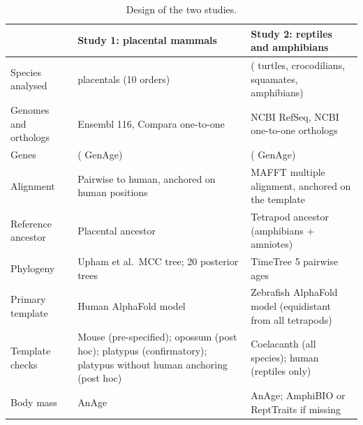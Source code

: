 \documentclass[11pt]{article}
\begin{document}
\begin{table}[tbp]
\centering
\caption{Design of the two studies.}
\label{tab:design}
\small
\begin{tabularx}{\textwidth}{p{3.3cm}YY}
\toprule
 & Study 1: placental mammals & Study 2: reptiles and amphibians \\
\midrule
Species analysed & \MNSpecies{} placentals (10 orders) & \RNSpecies{} (\RNTurtles{} turtles, \RNCrocs{} crocodilians, \RNSquamates{} squamates, \RNAmphibians{} amphibians) \\
Genomes and orthologs & Ensembl 116, Compara one-to-one & NCBI RefSeq, NCBI one-to-one orthologs \\
Genes & \MNGenes{} (\MNGenAge{} GenAge) & \RNGenes{} (\RNGenAge{} GenAge) \\
Alignment & Pairwise to human, anchored on human positions & MAFFT multiple alignment, anchored on the template \\
Reference ancestor & Placental ancestor & Tetrapod ancestor (amphibians + amniotes) \\
Phylogeny & Upham et al.\ MCC tree; 20 posterior trees & TimeTree 5 pairwise ages \\
Primary template & Human AlphaFold model & Zebrafish AlphaFold model (equidistant from all tetrapods) \\
Template checks & Mouse (pre-specified); opossum (post hoc); platypus (confirmatory); platypus without human anchoring (post hoc) & Coelacanth (all species); human (reptiles only) \\
Body mass & AnAge & AnAge; AmphiBIO or ReptTraits if missing \\
\bottomrule
\end{tabularx}
\end{table}
\end{document}
